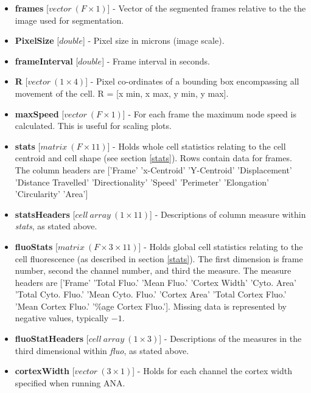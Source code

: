 \documentclass[a4paper,12pt]{article}
\begin{document}
\begin{itemize}
 \item \textbf{frames} [$vector~(F\times1)$] - Vector of the segmented frames relative to the the image used for segmentation.
 
  \item \textbf{PixelSize} [$double$] - Pixel size in microns (image scale).

 \item \textbf{frameInterval} [$double$] - Frame interval in seconds.
  
 \item \textbf{R} [$vector~(1\times4)$] - Pixel co-ordinates of a bounding box encompassing all movement of the cell.
 R = [x min, x max, y min, y max]. 
 
  \item \textbf{maxSpeed} [$vector~(F\times1)$] - For each frame the maximum node speed is calculated.
  This is useful for scaling plots.

 \item \textbf{stats} [$matrix~(F\times11)$] - Holds whole cell statistics relating to the cell centroid and cell shape (see
 section \ref{stats}).  Rows contain data for frames.  The column headers are ['Frame'    'x-Centroid'    'Y-Centroid' 
 'Displacement'   'Distance Travelled'    'Directionality'  'Speed'    'Perimeter'    'Elongation'    'Circularity'    'Area']

  \item \textbf{statsHeaders} [$cell~array~(1\times11)$] - Descriptions of column measure within \textit{stats}, as stated above.
  
  \item \textbf{fluoStats} [$matrix~(F\times3\times11)$] - Holds global cell statistics relating to the cell fluorescence (as described in
 section \ref{stats}).  The first dimension is frame number,  second the channel number, and third the measure.  The 
 measure headers are ['Frame'    'Total Fluo.'    'Mean Fluo.'    'Cortex Width'    'Cyto. Area'    'Total Cyto. Fluo.'
  'Mean Cyto. Fluo.'    'Cortex Area'    'Total Cortex Fluo.'    'Mean Cortex Fluo.'    '\%age Cortex Fluo.'].  Missing data is represented
  by negative values, typically $-1$.
  
  \item \textbf{fluoStatHeaders} [$cell~array~(1\times3)$] - Descriptions of the measures in the third dimensional
  within \textit{fluo}, as stated above.
  
  \item \textbf{cortexWidth} [$vector~(3\times1)$] - Holds for each channel the cortex width specified when running ANA. 
  

\end{itemize}
\end{document}
